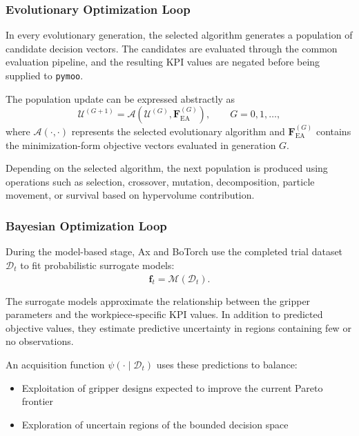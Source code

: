 \subsubsection{Evolutionary Optimization Loop}

In every evolutionary generation, the selected algorithm generates a population of candidate
decision vectors. The candidates are evaluated through the common evaluation pipeline, and the
resulting KPI values are negated before being supplied to \texttt{pymoo}.

The population update can be expressed abstractly as
\begin{equation}
    \mathcal{U}^{(G+1)}
    =
    \mathcal{A}
    \left(
        \mathcal{U}^{(G)},
        \mathbf{F}_{\mathrm{EA}}^{(G)}
    \right),
    \qquad
    G = 0,1,\ldots,
\end{equation}
where $\mathcal{A}(\cdot,\cdot)$ represents the selected evolutionary algorithm and
$\mathbf{F}_{\mathrm{EA}}^{(G)}$ contains the minimization-form objective vectors evaluated in
generation $G$.

Depending on the selected algorithm, the next population is produced using operations such as
selection, crossover, mutation, decomposition, particle movement, or survival based on hypervolume
contribution.

\subsubsection{Bayesian Optimization Loop}

During the model-based stage, Ax and BoTorch use the completed trial dataset $\mathcal{D}_t$ to fit
probabilistic surrogate models:
\begin{equation}
    \widehat{\mathbf{f}}_t
    =
    \mathcal{M}(\mathcal{D}_t).
\end{equation}

The surrogate models approximate the relationship between the gripper parameters and the
workpiece-specific KPI values. In addition to predicted objective values, they estimate predictive
uncertainty in regions containing few or no observations.

An acquisition function $\psi(\cdot\mid\mathcal{D}_t)$ uses these predictions to balance:
\begin{itemize}
    \item Exploitation of gripper designs expected to improve the current Pareto frontier
    \item Exploration of uncertain regions of the bounded decision space
\end{itemize}

